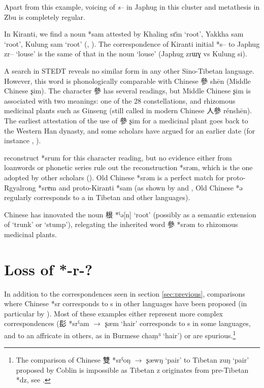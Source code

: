 \documentclass[oldfontcommands,oneside,a4paper,11pt]{article}
\newcommand{\ipa}[1]{{\phon #1}} %
\newcommand{\zh}[1]{{\cn #1}}
\newcommand{\archaic}[4]{\zh{#1} *\ipa{#2} $\rightarrow$ \ipa{#3} `#4'}
\begin{document}
Apart from this example, voicing of \textit{s--} in Japhug in this cluster and metathesis in Zbu is completely regular.

In Kiranti, we find a noun *\ipa{sam} attested by Khaling \ipa{sɛ̄m} `root', Yakkha  \ipa{sam} `root', Kulung \ipa{sam} `root' (\citealt{kongren07yakkha}, \citealt{tolsma06kulung}). The correspondence of Kiranti initial *s--  to Japhug \ipa{zr--} `louse' is the same of that in the noun `louse' (Japhug \ipa{zrɯɣ} vs Kulung \ipa{si}).

A search in STEDT reveals no similar form in any other Sino-Tibetan language. However, this word is phonologically comparable with Chinese \zh{參} \ipa{shēn} (Middle Chinese \ipa{ʂim}). The character  \zh{參} has several readings, but Middle Chinese \ipa{ʂim} is associated with two meanings: one of the 28 constellations, and rhizomous medicinal plants such as Ginseng (still called in modern Chinese \zh{人參} \ipa{rénshēn}). The earliest attestation of the use of \zh{參} \ipa{ʂim} for a medicinal plant goes back to the Western Han dynasty, and some scholars have argued for an earlier date (for instance \citealt{xu11shen}, \citealt{sun92renshen}). 

 \citet[75]{bs14oc} reconstruct *\ipa{srum} for this character reading, but no evidence either from loanwords or phonetic series rule out the reconstruction *\ipa{srəm}, which is the one adopted by other scholars (\citealt{schuessler09minimal}). Old Chinese *\ipa{srəm} is a perfect match for proto-Rgyalrong *\ipa{srɐm} and proto-Kiranti *\ipa{sam} (as shown by \citealt{gong95st} and \citealt{hill12sixvowels}, Old Chinese *\ipa{ə} regularly corresponds to \ipa{a} in Tibetan and other languages).

Chinese has innovated the noun \zh{根} *\ipa{[k]ˁə[n]} `root' (possibly as a semantic extension of `trunk' or `stump'), relegating the inherited word \zh{參} *\ipa{srəm} to rhizomous medicinal plants.

\section{Loss of *-r-?}
In addition to the correspondences seen in section \ref{sec:previous}, comparisons where Chinese *\ipa{sr} corresponds to \ipa{s} in other languages have been proposed (in particular by \citealt{coblin86handlist}). Most of these examples either represent more complex correspondences (\archaic{髟}{srˁam}{ʂæm}{hair} corresponds to \ipa{s} in some languages, and to an affricate in others, as in Burmese \ipa{chaṃ³} `hair') or are spurious.\footnote{The comparison of Chinese \archaic{雙}{srˁoŋ}{ʂæwŋ}{pair} to Tibetan \ipa{zuŋ} `pair' proposed by Coblin is impossible as Tibetan \ipa{z} originates from pre-Tibetan *\ipa{dz}, see \citet{hill14dz}. }
\end{document}
